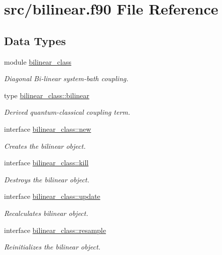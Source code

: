 \hypertarget{bilinear_8f90}{\section{src/bilinear.f90 File Reference}
\label{bilinear_8f90}
}
\subsection*{Data Types}
\begin{DoxyCompactItemize}
\item 
module \hyperlink{classbilinear__class}{bilinear\+\_\+class}
\begin{DoxyCompactList}\small\item\em Diagonal Bi-\/linear system-\/bath coupling. \end{DoxyCompactList}\item 
type \hyperlink{structbilinear__class_1_1bilinear}{bilinear\+\_\+class\+::bilinear}
\begin{DoxyCompactList}\small\item\em Derived quantum-\/classical coupling term. \end{DoxyCompactList}\item 
interface \hyperlink{interfacebilinear__class_1_1new}{bilinear\+\_\+class\+::new}
\begin{DoxyCompactList}\small\item\em Creates the bilinear object. \end{DoxyCompactList}\item 
interface \hyperlink{interfacebilinear__class_1_1kill}{bilinear\+\_\+class\+::kill}
\begin{DoxyCompactList}\small\item\em Destroys the bilinear object. \end{DoxyCompactList}\item 
interface \hyperlink{interfacebilinear__class_1_1update}{bilinear\+\_\+class\+::update}
\begin{DoxyCompactList}\small\item\em Recalculates bilinear object. \end{DoxyCompactList}\item 
interface \hyperlink{interfacebilinear__class_1_1resample}{bilinear\+\_\+class\+::resample}
\begin{DoxyCompactList}\small\item\em Reinitializes the bilinear object. \end{DoxyCompactList}\item 

\end{DoxyCompactItemize}
